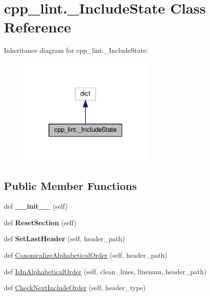 \hypertarget{classcpp__lint_1_1___include_state}{}\section{cpp\+\_\+lint.\+\_\+\+Include\+State Class Reference}
\label{classcpp__lint_1_1___include_state}


Inheritance diagram for cpp\+\_\+lint.\+\_\+\+Include\+State\+:
\nopagebreak
\begin{figure}[H]
\begin{center}
\leavevmode
\includegraphics[width=193pt]{classcpp__lint_1_1___include_state__inherit__graph}
\end{center}
\end{figure}
\subsection*{Public Member Functions}
\begin{DoxyCompactItemize}
\item 
\mbox{\label{classcpp__lint_1_1___include_state_abe6491f4057c5ce8dd92ba8ab1c018f7}} 
def {\bfseries \+\_\+\+\_\+init\+\_\+\+\_\+} (self)
\item 
\mbox{\label{classcpp__lint_1_1___include_state_a05174be66fff5cad7b4eb08491bc7770}} 
def {\bfseries Reset\+Section} (self)
\item 
\mbox{\label{classcpp__lint_1_1___include_state_abe16f3eddcf8d1cdc3f74184c69f0de0}} 
def {\bfseries Set\+Last\+Header} (self, header\+\_\+path)
\item 
def \mbox{\hyperlink{classcpp__lint_1_1___include_state_a350d25886a03f0291676f533282f7eb8}{Canonicalize\+Alphabetical\+Order}} (self, header\+\_\+path)
\item 
def \mbox{\hyperlink{classcpp__lint_1_1___include_state_a7849c0d95d8f156e7678ff6f76ede724}{Is\+In\+Alphabetical\+Order}} (self, clean\+\_\+lines, linenum, header\+\_\+path)
\item 
def \mbox{\hyperlink{classcpp__lint_1_1___include_state_abe91796a07f2ade774d3ecb934a67f80}{Check\+Next\+Include\+Order}} (self, header\+\_\+type)
\end{DoxyCompactItemize}


